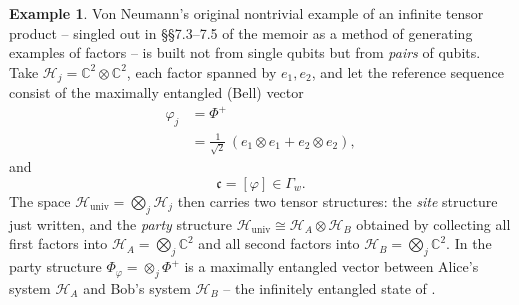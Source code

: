 \documentclass[twoside,11pt,letter]{article}
\def\bC{\mathbb{C}}
\def\cH{{\mathcal{H}}}
\def\fc{{\mathfrak{c}}}
\theoremstyle{definition}
\theoremstyle{definition}
\newtheorem{example}[theorem]{Example}
\theoremstyle{plain}
\begin{document}
\begin{example}\label{bellEx}
Von Neumann's original nontrivial example of an infinite tensor product -- singled out in \S\S 7.3--7.5 of the memoir \cite{vN39} as a method of generating examples of factors -- is built not from single qubits but from \emph{pairs} of qubits. Take $\cH_j=\bC^2\otimes\bC^2$, each factor spanned by $e_1,e_2$, and let the reference sequence consist of the maximally entangled (Bell) vector
\begin{equation*}
\begin{split}
\varphi_j&=\Phi^+\\
&=\frac1{\sqrt2}\,(e_1\otimes e_1+e_2\otimes e_2),
\end{split}
\end{equation*}
and
\begin{equation*}
\fc=[\varphi]\in\Gamma_w.
\end{equation*}
The space $\cH_{\mathrm{univ}}=\bigotimes_j\cH_j$ then carries two tensor structures: the \emph{site} structure just written, and the \emph{party} structure $\cH_{\mathrm{univ}}\cong\cH_A\otimes\cH_B$ obtained by collecting all first factors into $\cH_A=\bigotimes_j\bC^2$ and all second factors into $\cH_B=\bigotimes_j\bC^2$. In the party structure $\Phi_\varphi=\otimes_j\Phi^+$ is a maximally entangled vector between Alice's system $\cH_A$ and Bob's system $\cH_B$ -- the infinitely entangled state of \cite{KSW03}.


\end{example}
\end{document}

